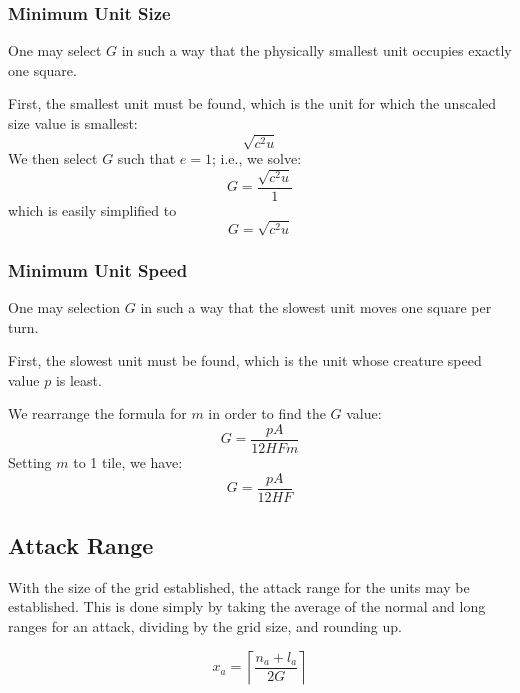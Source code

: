 \documentclass[twocolumn]{article}
\begin{document}
\subsubsection{Minimum Unit Size}

One may select $G$ in such a way that the physically smallest unit
occupies exactly one square.

First, the smallest unit must be found,
which is the unit for which the unscaled size value is smallest:
\[
    \sqrt{c^2 u}
\]
We then select $G$ such that $e = 1$;
i.e., we solve:
\[
    G = \frac
            {\sqrt{c^2 u}}
            {1}
\]
which is easily simplified to
\[
    G = \sqrt{c^2 u}
\]

\subsubsection{Minimum Unit Speed}

One may selection $G$ in such a way that the slowest unit moves one square per turn.

First, the slowest unit must be found,
which is the unit whose creature speed value $p$ is least.

We rearrange the formula for $m$ in order to find the $G$ value:
\[
    G = \frac
            {p A}
            {12 H F m}
\]
Setting $m$ to 1 tile, we have:
\[
    G = \frac
            {p A}
            {12 H F}
\]

\subsection{Attack Range}

With the size of the grid established, the attack range for the units may be established.
This is done simply by taking the average of the normal and long ranges for an attack,
dividing by the grid size,
and rounding up.

\[
    x_a = \left\lceil\frac
        {n_a + l_a}
        {2 G}
        \right\rceil
\]





\end{document}
